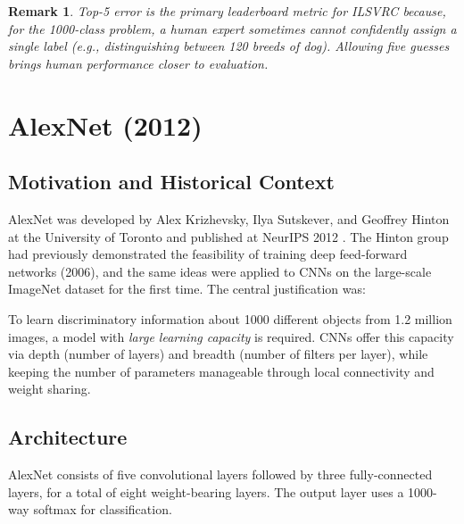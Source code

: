 \documentclass[12pt,a4paper]{article}
\newtheorem{remark}{Remark}[section]
\begin{document}
\begin{remark}
Top-5 error is the primary leaderboard metric for ILSVRC because, for the 1000-class problem, a human expert sometimes cannot confidently assign a single label (e.g., distinguishing between 120 breeds of dog). Allowing five guesses brings human performance closer to evaluation.
\end{remark}

\section{AlexNet (2012)}
\label{sec:alexnet}

\subsection{Motivation and Historical Context}

AlexNet was developed by Alex Krizhevsky, Ilya Sutskever, and Geoffrey Hinton at the University of Toronto and published at NeurIPS 2012 \cite{alexnet2012}. The Hinton group had previously demonstrated the feasibility of training deep feed-forward networks (2006), and the same ideas were applied to CNNs on the large-scale ImageNet dataset for the first time. The central justification was:

\begin{keyinsight}
To learn discriminatory information about 1000 different objects from 1.2 million images, a model with \emph{large learning capacity} is required. CNNs offer this capacity via depth (number of layers) and breadth (number of filters per layer), while keeping the number of parameters manageable through local connectivity and weight sharing.
\end{keyinsight}

\subsection{Architecture}

AlexNet consists of five convolutional layers followed by three fully-connected layers, for a total of eight weight-bearing layers. The output layer uses a 1000-way softmax for classification.
\end{document}
